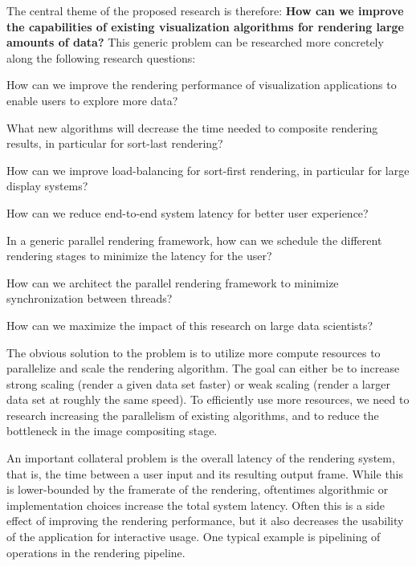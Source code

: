  The central theme of the proposed research is therefore: {\bf How can we improve
 the capabilities of existing visualization algorithms for rendering large
 amounts of data?} This generic problem can be researched more concretely along
 the following research questions:
 \begin{compactenum}
  \item How can we improve the rendering performance of visualization applications to enable users to explore more data?
  \begin{compactenum}
   \item What new algorithms will decrease the time needed to composite rendering results, in particular for sort-last rendering?
   \item How can we improve load-balancing for sort-first rendering, in particular for large display systems?
  \end{compactenum}
  \item How can we reduce end-to-end system latency for better user experience?
  \begin{compactenum}
   \item In a generic parallel rendering framework, how can we schedule the different rendering stages to minimize the latency for the user?
   \item How can we architect the parallel rendering framework to minimize synchronization between threads?
  \end{compactenum}
  \item How can we maximize the impact of this research on large data scientists?
 \end{compactenum}

 The obvious solution to the problem is to utilize more compute resources to
 parallelize and scale the rendering algorithm. The goal can either be to
 increase strong scaling (render a given data set faster) or weak scaling (render
 a larger data set at roughly the same speed). To efficiently use more resources,
 we need to research increasing the parallelism of existing algorithms, and to
 reduce the bottleneck in the image compositing stage.

 An important collateral problem is the overall latency of the rendering system,
 that is, the time between a user input and its resulting output frame. While
 this is lower-bounded by the framerate of the rendering, oftentimes algorithmic
 or implementation choices increase the total system latency. Often this is a
 side effect of improving the rendering performance, but it also decreases the
 usability of the application for interactive usage. One typical example is
 pipelining of operations in the rendering pipeline.

